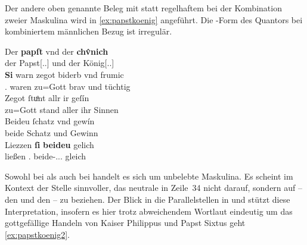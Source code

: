 Der andere oben genannte Beleg mit  statt regelhaftem 
bei der Kombination zweier Maskulina wird in \cref{ex:papstkoenig} angeführt.
Die -Form des Quantors bei kombiniertem männlichen Bezug ist
irregulär. %

\begin{exe}
\ex\label{ex:papstkoenig} %
	\gll Der \textbf{papſt} vnd der \textbf{chv̂nich} \\
		der Papst[\Nom.\Sg.\MascM] und der König[\Nom.\Sg.\MascM] \\
\sn \gll \textbf{Si} warn zegot biderb vnd frumic \\
		\Tpl\subM.\Nom{} waren {zu=Gott} brav und tüchtig \\
\sn \gll Zegot ſtuͦnt allr ir geſín \\
		{zu=Gott} stand aller ihr Sinnen \\
\sn \gll Beideu ſchatz vnd gewín \\
		beide Schatz und Gewinn \\
\sn \gll Liezzen \textbf{ſi} \textbf{beideu} gelich \\
		ließen \Tpl\subM.\Nom{} beide-\Nom.\Pl.\NeutM.\St{} gleich \\
	\begin{taggedline}{\parencites[\pno~17\vb, 30--34]{kc:B1}[vgl. abweichend][6110--6113]{schroeder1895}}
	\trans {}
	\end{taggedline}
\end{exe}

Sowohl bei   als auch bei  
handelt es sich um unbelebte Maskulina. Es scheint im Kontext der Stelle
sinnvoller, das neutrale  in Zeile~34 nicht darauf, sondern auf
 -- den   und den   --
zu beziehen. Der Blick in die Parallelstellen in \citet{kc:VB} und
\citet{kc:A1} stützt diese Interpretation, insofern es hier trotz abweichendem
Wortlaut eindeutig um das gottgefällige Handeln von Kaiser Philippus und Papst
Sixtus geht \cref{ex:papstkoenig2}.

